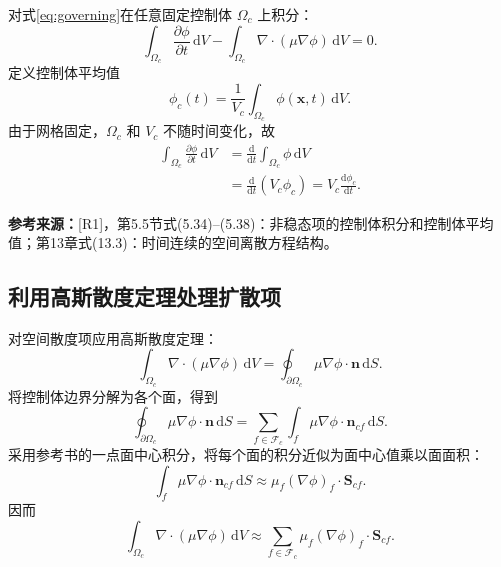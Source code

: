 \documentclass[UTF8,12pt,a4paper]{ctexart}
\numberwithin{equation}{section}
\newcommand{\Rone}{\textnormal{[R1]}}
\newcommand{\source}[1]{%
  \par\smallskip
  \noindent\colorbox{sourcebg}{%
    \parbox{0.955\linewidth}{\raggedright\footnotesize\color{sourcegray}\textbf{参考来源：}#1}%
  }
  \par\smallskip
}
\newcommand{\dd}{\,\mathrm d}
\newcommand{\Sf}{\bm S}
\newcommand{\xf}{\bm x}
\begin{document}
对式\eqref{eq:governing}在任意固定控制体 $\Omega_c$ 上积分：
\begin{equation}
  \int_{\Omega_c}\frac{\partial\phi}{\partial t}\dd V
  -\int_{\Omega_c}\nabla\cdot(\mu\nabla\phi)\dd V=0.
  \label{eq:cell_integrated}
\end{equation}
定义控制体平均值
\begin{equation}
  \phi_c(t)
  =\frac{1}{V_c}\int_{\Omega_c}\phi(\xf,t)\dd V.
  \label{eq:cell_average}
\end{equation}
由于网格固定，$\Omega_c$ 和 $V_c$ 不随时间变化，故
\begin{align}
  \int_{\Omega_c}\frac{\partial\phi}{\partial t}\dd V
  &=\frac{\mathrm d}{\mathrm dt}
    \int_{\Omega_c}\phi\dd V
    \label{eq:time_interchange}\\
  &=\frac{\mathrm d}{\mathrm dt}(V_c\phi_c)
   =V_c\frac{\mathrm d\phi_c}{\mathrm dt}.
  \label{eq:time_term_cell}
\end{align}

\source{\Rone，第5.5节式(5.34)--(5.38)：非稳态项的控制体积分和控制体平均值；第13章式(13.3)：时间连续的空间离散方程结构。}

\subsection{利用高斯散度定理处理扩散项}

对空间散度项应用高斯散度定理：
\begin{equation}
  \int_{\Omega_c}\nabla\cdot(\mu\nabla\phi)\dd V
  =\oint_{\partial\Omega_c}\mu\nabla\phi\cdot\bm n\dd S.
  \label{eq:gauss_theorem}
\end{equation}
将控制体边界分解为各个面，得到
\begin{equation}
  \oint_{\partial\Omega_c}\mu\nabla\phi\cdot\bm n\dd S
  =\sum_{f\in\mathcal F_c}
    \int_f\mu\nabla\phi\cdot\bm n_{cf}\dd S.
  \label{eq:boundary_face_sum}
\end{equation}
采用参考书的一点面中心积分，将每个面的积分近似为面中心值乘以面面积：
\begin{equation}
  \int_f\mu\nabla\phi\cdot\bm n_{cf}\dd S
  \approx
  \mu_f(\nabla\phi)_f\cdot\Sf_{cf}.
  \label{eq:face_midpoint}
\end{equation}
因而
\begin{equation}
  \int_{\Omega_c}\nabla\cdot(\mu\nabla\phi)\dd V
  \approx
  \sum_{f\in\mathcal F_c}
  \mu_f(\nabla\phi)_f\cdot\Sf_{cf}.
  \label{eq:diffusion_face_sum}
\end{equation}
\end{document}

